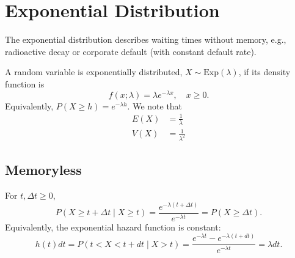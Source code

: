 \documentclass{article}
\begin{document}
 
 \section{Exponential Distribution}
 The exponential distribution describes waiting times without memory, e.g., radioactive decay or corporate default (with constant default rate).
 
 A random variable is exponentially distributed, $X \sim \textrm{Exp}(\lambda)$, if its density function is
 \begin{equation*}
 f(x;\lambda) = \lambda e^{-\lambda x}, \quad x \geq 0.
 \end{equation*}
 Equivalently, $P(X \geq h) = e^{-\lambda h}$. We note that
 \begin{equation}
 \begin{split}
 E(X) &= \frac{1}{\lambda} \\
 V(X) &= \frac{1}{\lambda^2}
 \end{split}
 \end{equation} 
 
 \subsection{Memoryless}
 For $t, \Delta t \geq 0$, 
 \begin{equation*}
 P(X \geq t + \Delta t \mid X \geq t) = \frac{e^{-\lambda (t + \Delta t)}}{e^{-\lambda t}} = P(X \geq \Delta t).
 \end{equation*}
Equivalently, the exponential hazard function is constant:
 \begin{equation*}
 h(t) dt = P(t < X < t + dt \mid X > t) = \frac{e^{-\lambda t} - e^{-\lambda (t+dt)}}{e^{-\lambda t}}  = \lambda dt .
 \end{equation*}
 
 	
 
 
\end{document}

